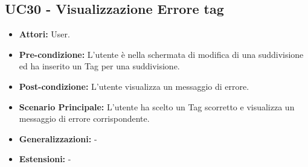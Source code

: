 \subsection{UC30 - Visualizzazione Errore tag}
\begin{itemize}
    \item \textbf{Attori:} User.
    \item \textbf{Pre-condizione:}  L'utente è nella schermata di modifica di una  suddivisione ed ha inserito un Tag per una suddivisione.
    \item \textbf{Post-condizione:} L'utente visualizza un messaggio di errore.
    \item \textbf{Scenario Principale:} L'utente ha scelto un Tag scorretto e visualizza un messaggio di errore corrispondente.
    \item \textbf{Generalizzazioni:} -
    \item \textbf{Estensioni:} -
\end{itemize}